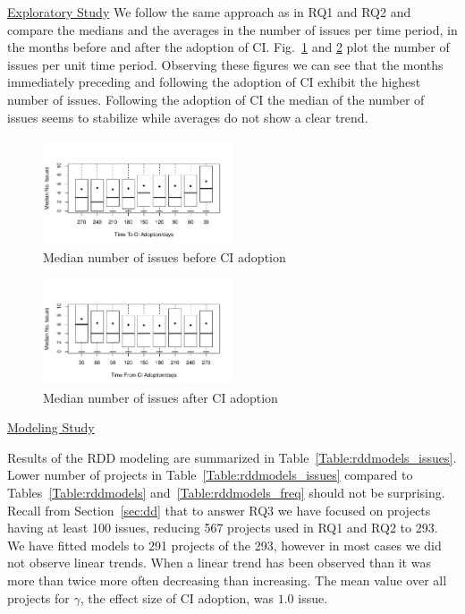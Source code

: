 \noindent \underline{Exploratory Study}
We follow the same approach as in RQ1 and RQ2 and compare the medians and the averages in the number of issues per time period, in the months
before and after the adoption of CI.
Fig.~\ref{Fig:IssuesBefore} and \ref{Fig:IssuesAfter} plot the number of issues per unit time period.
Observing these figures we can see that the months immediately 
preceding and following the adoption of CI exhibit the highest number of issues.
Following the adoption of CI the median of the number of issues seems to stabilize while averages do
not show a clear trend. 


\begin{figure}[!t]
\centering
\includegraphics[width=0.5\textwidth]{issues_before.pdf}
\caption{Median number of issues before CI adoption}
\label{Fig:IssuesBefore}
\end{figure}


\begin{figure}[!t]
\centering
\includegraphics[width=0.5\textwidth]{issues_after.pdf}
\caption{Median number of issues after CI adoption}
\label{Fig:IssuesAfter}
\end{figure}

\noindent \underline{Modeling Study}

Results of the RDD modeling are summarized in Table~\ref{Table:rddmodels_issues}.
Lower number of projects in Table~\ref{Table:rddmodels_issues} compared to Tables~\ref{Table:rddmodels} 
and~\ref{Table:rddmodels_freq} should not be surprising. 
Recall from Section~\ref{sec:dd} that to answer RQ3 we have focused on projects having at least 100 issues,
 reducing 567 projects used in RQ1 and RQ2 to 293.
We have fitted models to 291 projects of the 293, however in most cases we did not observe linear trends.
When a linear trend has been observed than it was more than twice more often decreasing than increasing.
The mean value over all projects for $\gamma$, the effect size of CI adoption, was $1.0$ issue.


